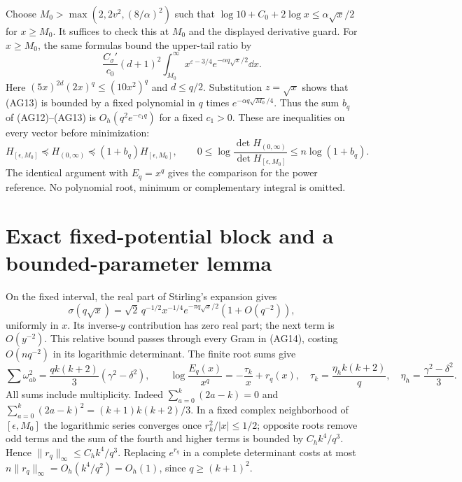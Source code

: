 Choose $M_0>\max(2,2v^2,(8/\alpha)^2)$ such that
$\log10+C_0+2\log x\le\alpha\sqrt x/2$ for $x\ge M_0$.
It suffices to check this at $M_0$ and the displayed derivative guard.
For $x\ge M_0$, the same formulas bound the upper-tail ratio by
\begin{equation}\tag{AG13}
 \frac{C_\sigma'}{c_0}(d+1)^2
 \int_{M_0}^\infty x^{\varepsilon-3/4}
                  e^{-\alpha q\sqrt x/2}\dd x.
\end{equation}
Here $(5x)^{2d}(2x)^q\le(10x^2)^q$ and $d\le q/2$.
Substitution $z=\sqrt x$ shows that (AG13) is bounded by a fixed
polynomial in $q$ times $e^{-\alpha q\sqrt{M_0}/4}$.
Thus the sum $b_q$ of (AG12)--(AG13) is $O_h(q^2e^{-c_1q})$ for a
fixed $c_1>0$. These are inequalities on every vector before minimization:
\begin{equation}\tag{AG14}
 H_{[\epsilon,M_0]}\preceq H_{(0,\infty)}
 \preceq(1+b_q)H_{[\epsilon,M_0]},\qquad
 0\le\log\frac{\det H_{(0,\infty)}}{\det H_{[\epsilon,M_0]}}
 \le n\log(1+b_q).
\end{equation}
The identical argument with $E_q=x^q$ gives the comparison for the power
reference. No polynomial root, minimum or complementary integral is omitted.

\section{Exact fixed-potential block and a bounded-parameter lemma}
On the fixed interval, the real part of Stirling's expansion gives
\begin{equation}\tag{AG15}
 \sigma(q\sqrt x)=\sqrt2\,q^{-1/2}x^{-1/4}
 e^{-\pi q\sqrt x/2}(1+O(q^{-2})),
\end{equation}
uniformly in $x$. Its inverse-$y$ contribution has zero real part;
the next term is $O(y^{-2})$. This relative bound passes through every
Gram in (AG14), costing $O(nq^{-2})$ in its logarithmic determinant.
The finite root sums give
\begin{equation}\tag{AG16}
 \sum\omega_{ab}^2=\frac{qk(k+2)}3(\gamma^2-\delta^2),\qquad
 \log\frac{E_q(x)}{x^q}=-\frac{\tau_k}{x}+r_q(x),
 \quad \tau_k=\frac{\eta_hk(k+2)}q,\quad
 \eta_h=\frac{\gamma^2-\delta^2}3.
\end{equation}
All sums include multiplicity. Indeed
$\sum_{a=0}^k(2a-k)=0$ and
$\sum_{a=0}^k(2a-k)^2=(k+1)k(k+2)/3$.
In a fixed complex neighborhood of $[\epsilon,M_0]$ the logarithmic series
converges once $r_k^2/|x|\le1/2$; opposite roots remove odd terms and the
sum of the fourth and higher terms is bounded by
$C_h k^4/q^3$. Hence $\|r_q\|_\infty\le C_hk^4/q^3$.
Replacing $e^{r_q}$ in a complete determinant costs at most
$n\|r_q\|_\infty=O_h(k^4/q^2)=O_h(1)$, since $q\ge(k+1)^2$.

